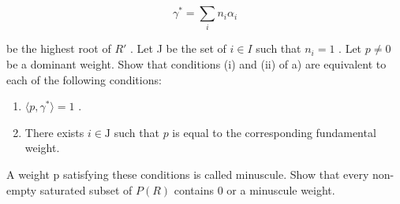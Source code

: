 \[
\gamma^ {*} = \sum_ {i} n _ {i} \alpha_ {i}
\]

be the highest root of \(R'\) . Let J be the set of \(i \in I\) such that \(n_{i} = 1\) . Let \(p \neq 0\) be a dominant weight. Show that conditions (i) and (ii) of a) are equivalent to each of the following conditions:

\begin{enumerate}
\def\labelenumi{(\roman{enumi})}
\setcounter{enumi}{2}
\item
  \(\langle p, \gamma^{*} \rangle = 1\) .
\item
  There exists \(i \in \mathrm{J}\) such that \(p\) is equal to the corresponding fundamental weight.
\end{enumerate}

A weight p satisfying these conditions is called minuscule. Show that every non-empty saturated subset of \(P(R)\) contains 0 or a minuscule weight.

